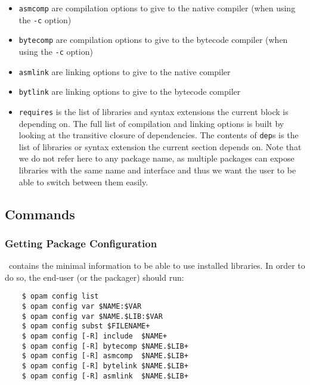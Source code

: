 \documentclass[a4paper,10pt]{article}
\begin{document}
\begin{itemize}
\item {\tt asmcomp} are compilation options to give to the native
  compiler (when using the {\tt -c} option)
\item {\tt bytecomp} are compilation options to give to the bytecode
  compiler (when using the {\tt -c} option)
\item {\tt asmlink} are linking options to give to the native compiler
\item {\tt bytlink} are linking options to give to the bytecode
  compiler
\item {\tt requires} is the list of libraries and syntax extensions
  the current block is depending on. The full list of compilation
  and linking options is built by looking at the transitive closure of
  dependencies. The contents of {\tt dep}s is the list of libraries or
  syntax extension the current section depends on. Note that we do not
  refer here to any package name, as multiple packages can expose libraries
  with the same name and interface and thus we want the user to be able
  to switch between them easily.
\end{itemize}

\subsection{Commands}

\subsubsection{Getting Package Configuration}
\label{opam-config}

\OPAM\ contains the minimal information to be able to use installed
libraries. In order to do so, the end-user (or the packager) should
run:

\begin{verbatim}
    $ opam config list
    $ opam config var $NAME:$VAR
    $ opam config var $NAME.$LIB:$VAR
    $ opam config subst $FILENAME+
    $ opam config [-R] include  $NAME+
    $ opam config [-R] bytecomp $NAME.$LIB+
    $ opam config [-R] asmcomp  $NAME.$LIB+
    $ opam config [-R] bytelink $NAME.$LIB+
    $ opam config [-R] asmlink  $NAME.$LIB+
\end{verbatim}
\end{document}
